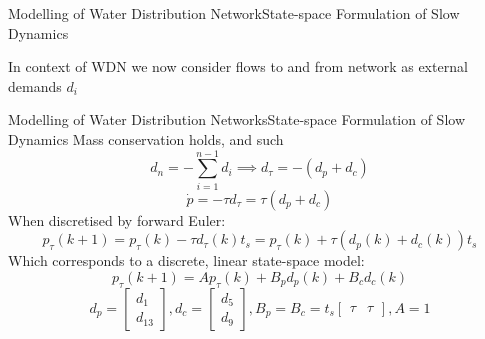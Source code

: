 \begin{frame}{Modelling of Water Distribution Network}{State-space Formulation of Slow Dynamics}
	\begin{figure}[h!]
		\centering
		\resizebox{\columnwidth}{!}{
			}
		\label{fig:tikzWDNGraph}
	\end{figure}  
	In context of WDN we now consider flows to and from network as external demands $ d_i $
\end{frame}

\begin{frame}{Modelling of Water Distribution Networks}{State-space Formulation of Slow Dynamics}
	Mass conservation holds, and such
	\begin{equation*}
		d_n = -\sum_{i=1}^{n-1}d_i \implies d_\tau = - (d_p + d_c)
	\end{equation*}
	\begin{equation*}
		\dot{p} = -\tau d_\tau = \tau (d_p + d_c)
	\end{equation*}	
	When discretised by forward Euler:
	\begin{equation*}
		p_\tau(k+1) = p_\tau(k) - \tau d_\tau(k) t_s = p_\tau(k) + \tau(d_p(k) + d_c(k)) t_s
	\end{equation*}
	Which corresponds to a discrete, linear state-space model:
	\begin{equation}
		p_\tau(k+1) = Ap_\tau(k) + B_pd_p(k) + B_cd_c(k)
	\end{equation}
	\begin{equation*}
		d_p = \begin{bmatrix}
			d_1 \\ d_{13}
		\end{bmatrix},
		d_c = \begin{bmatrix}
			d_5 \\ d_9
		\end{bmatrix},
		B_p = B_c = t_s  \begin{bmatrix}
			\tau & \tau
		\end{bmatrix},
		A = 1
	\end{equation*}
\end{frame}


